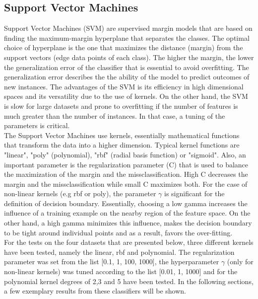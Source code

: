 \documentclass{article}
\begin{document}
\subsection{Support Vector Machines}
Support Vector Machines (SVM) are supervised margin models that are based on finding the maximum-margin hyperplane that separates the classes. The optimal choice of hyperplane is the one that maximizes the distance (margin) from the support vectors (edge data points of each class). The higher the margin, the lower the generalization error of the classifier that is essential to avoid overfitting. The generalization error describes the the ability of the model to predict outcomes of new instances. The advantages of the SVM is its efficiency in high dimensional spaces and its versatility due to the use of kernels. On the other hand, the SVM is slow for large datasets and prone to overfitting if the number of features is much greater than the number of instances. In that case, a tuning of the parameters is critical.
\\
The Support Vector Machines use kernels, essentially mathematical functions that transform the data into a higher dimension. Typical kernel functions are "linear", "poly" (polynomial), "rbf" (radial basis function) or "sigmoid". Also, an important parameter is the regularization parameter (C) that is used to balance the maximization of the margin and the missclassification. High C decreases the margin and the missclassification while small C maximizes both. For the case of non-linear kernels (e.g rbf or poly), the parameter $\gamma$ is significant for the definition of decision boundary. Essentially, choosing a low gamma increases the influence of a training example on the nearby region of the feature space. On the other hand, a high gamma minimizes this influence, makes the decision boundary to be tight around individual points and as a result, favors the over-fitting.
\\
For the tests on the four datasets that are presented below, three different kernels have been tested, namely the linear, rbf and polynomial. The regularization parameter was set from the list [0.1, 1, 100, 1000], the hyperparameter $\gamma$ (only for non-linear kernels) was tuned according to the list [0.01, 1, 1000] and for the polynomial kernel degrees of 2,3 and 5 have been tested.
\newline
In the following sections, a few exemplary results from these classifiers will be shown.
\end{document}
